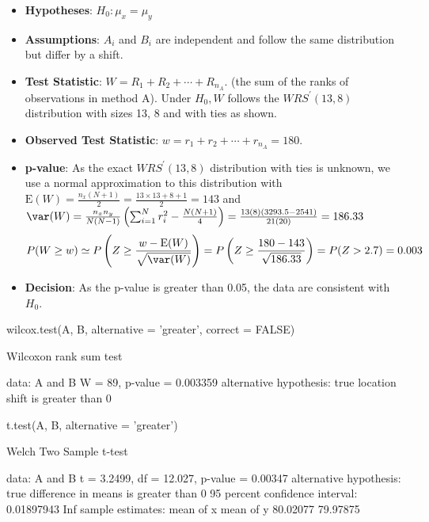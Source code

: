 \documentclass[a4paper]{article}\usepackage[]{graphicx}\usepackage[]{xcolor}
\begin{document}
\begin{itemize}
	\item \textbf{Hypotheses}: \( H_0: \mu_x = \mu_y \)
	\item \textbf{Assumptions}: \( A_i \) and \( B_i \) are independent and follow the same distribution but differ by a shift.
	\item \textbf{Test Statistic}: \( W = R_1 + R_2 + \dotsb + R_{n_A} \). (the sum of the ranks of observations in method A). Under \( H_0, W \) follows the \( WRS^\prime (13,8) \) distribution with sizes 13, 8 and with ties as shown.
	\item \textbf{Observed Test Statistic}: \( w = r_1 + r_2 + \dotsb + r_{n_A} = 180 \).
	\item \textbf{p-value}: As the exact \( WRS^\prime (13,8) \) distribution with ties is unknown, we use a normal approximation to this distribution with \( \mathrm{E}(W) = \frac{n_x (N+1)}{2} = \frac{13\times 13 + 8 + 1}{2} = 143 \) and \( \var(W) = \frac{n_x n_y}{N(N-1)} \left( \sum_{i=1}^{N} r^{2}_{i} - \frac{N(N+1)}{4} \right) = \frac{13 (8) (3293.5-2541)}{21(20)} = 186.33 \)
	\[
		P(W \geq w) \simeq P \left( Z \geq \frac{w-\mathrm{E}(W)}{\sqrt{\var(W)}} \right) = P \left( Z \geq \frac{180 - 143}{\sqrt{186.33}} \right) = P(Z > 2.7) = 0.003
	\]
	\item \textbf{Decision}: As the p-value is greater than 0.05, the data are consistent with \( H_0 \).
\end{itemize}
\begin{Schunk}
\begin{Sinput}
wilcox.test(A, B, alternative = 'greater', correct = FALSE)
\end{Sinput}
\begin{Soutput}

	Wilcoxon rank sum test

data:  A and B
W = 89, p-value = 0.003359
alternative hypothesis: true location shift is greater than 0
\end{Soutput}
\begin{Sinput}
t.test(A, B, alternative = 'greater')
\end{Sinput}
\begin{Soutput}

	Welch Two Sample t-test

data:  A and B
t = 3.2499, df = 12.027, p-value = 0.00347
alternative hypothesis: true difference in means is greater than 0
95 percent confidence interval:
 0.01897943        Inf
sample estimates:
mean of x mean of y 
 80.02077  79.97875 
\end{Soutput}
\end{Schunk}
\end{document}
